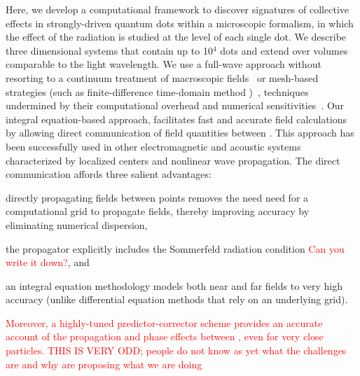 Here, we develop a computational framework to discover signatures of collective effects in strongly-driven quantum dots within a microscopic formalism, in which the effect of the radiation is studied at the level of each single dot. We describe three dimensional systems that contain up to 10$^4$ dots and extend over  volumes comparable to the light wavelength. We use a full-wave approach without resorting to a continuum treatment of macroscopic fields~\cite{} or mesh-based strategies (such as finite-difference time-domain method )~\cite{Vanneste2001, Fratalocchi2008}, techniques undermined by their computational overhead and numerical sensitivities~\cite{Baczewski2013}. Our integral equation-based approach, facilitates fast and accurate field calculations by allowing direct communication of field quantities between \qds{}. This approach has been successfully used in other electromagnetic \cite{otherpapersfromshanker} and acoustic \cite{yourPRE} systems characterized by localized centers and nonlinear wave propagation.
The direct communication affords three salient advantages:
  \begin{inparaenum}[(i)]
    \item directly propagating fields between points removes the need need for a computational grid to propagate fields, thereby improving accuracy by eliminating numerical dispersion,
    \item the propagator explicitly includes the Sommerfeld radiation condition \textcolor{red}{Can you write it down?}, and
    \item an integral equation methodology models both near and far fields to very high accuracy (unlike differential equation methods that rely on an underlying grid).
  \end{inparaenum}
\textcolor{red}{Moreover, a highly-tuned predictor-corrector scheme provides an accurate account of the propagation and phase effects between \qds{}, even for very close particles.
THIS IS VERY ODD; people do not know as yet what the challenges are and why are proposing what we are doing}

